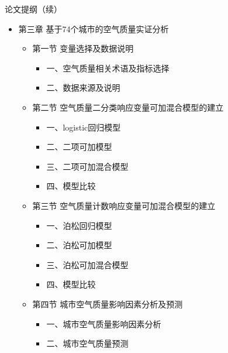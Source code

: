\documentclass[ignorenonframetext,11pt,xcolor=dvipsnames,aspectratio=1610,hyperref={bookmarksdepth=4}]{beamer}
\providecommand{\tightlist}{%
  \setlength{\itemsep}{0pt}\setlength{\parskip}{0pt}}
\begin{document}
\begin{frame}{论文提纲（续）}

\begin{itemize}
\tightlist
\item
  第三章 基于74个城市的空气质量实证分析

  \begin{itemize}
  \tightlist
  \item
    第一节 变量选择及数据说明

    \begin{itemize}
    \tightlist
    \item
      一、空气质量相关术语及指标选择
    \item
      二、数据来源及说明
    \end{itemize}
  \item
    第二节 空气质量二分类响应变量可加混合模型的建立

    \begin{itemize}
    \tightlist
    \item
      一、logistic回归模型
    \item
      二、二项可加模型
    \item
      三、二项可加混合模型
    \item
      四、模型比较
    \end{itemize}
  \item
    第三节 空气质量计数响应变量可加混合模型的建立

    \begin{itemize}
    \tightlist
    \item
      一、泊松回归模型
    \item
      二、泊松可加模型
    \item
      三、泊松可加混合模型
    \item
      四、模型比较
    \end{itemize}
  \item
    第四节 城市空气质量影响因素分析及预测

    \begin{itemize}
    \tightlist
    \item
      一、城市空气质量影响因素分析
    \item
      二、城市空气质量预测
    \end{itemize}
  \end{itemize}
\end{itemize}

\end{frame}
\end{document}

